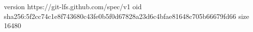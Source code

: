 version https://git-lfs.github.com/spec/v1
oid sha256:5f2cc74c1e8f743680c43fe0b5f0d67828a23d6c4bfae81648c705b66679fd66
size 16480
